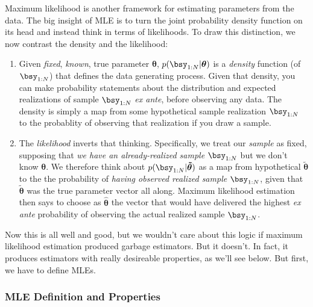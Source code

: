 \documentclass[12pt]{article}
\theoremstyle{plain}
\theoremstyle{definition}
\theoremstyle{remark}
\newcommand{\bstheta}{\boldsymbol{\theta}}
\newcommand{\bshattheta}{\boldsymbol{\hat{\theta}}}
\newcommand{\bstildetheta}{\boldsymbol{\tilde{\theta}}}
\begin{document}
Maximum likelihood is another framework for estimating parameters from
the data. The big insight of MLE is to turn the joint probability
density function on its head and instead think in terms of likelihoods.
To draw this distinction, we now contrast the density and the
likelihood:
\begin{enumerate}[label=(\roman*)]
  \item Given \emph{fixed}, \emph{known}, true parameter $\bstheta$,
    $p(\bsy_{1:N}|\bstheta)$ is a \emph{density} function (of
    $\bsy_{1:N}$) that defines the data generating process.  Given that
    density, you can make probability statements about the distribution
    and expected realizations of sample $\bsy_{1:N}$ \emph{ex ante},
    before observing any data. The density is simply a map from some
    hypothetical sample realization $\bsy_{1:N}$ to the probablity of
    observing that realization if you draw a sample.

  \item The \emph{likelihood} inverts that thinking. Specifically, we
    treat our \emph{sample} as fixed, supposing that
    \emph{we have an already-realized sample} $\bsy_{1:N}$ but we don't
    know $\bstheta$.  We therefore think about
    $p(\bsy_{1:N}|\bstildetheta)$ as a map from hypothetical
    $\bstildetheta$ to the the probability of
    \emph{having observed realized sample $\bsy_{1:N}$},
    given that $\bstildetheta$ was the true parameter vector all along.
    Maximum likelihood estimation then says to choose as $\bshattheta$
    the vector that would have delivered the highest \emph{ex ante}
    probability of observing the actual realized sample $\bsy_{1:N}$.
\end{enumerate}
Now this is all well and good, but we wouldn't care about this logic if
maximum likelihood estimation produced garbage estimators. But it
doesn't. In fact, it produces estimators with really desireable
properties, as we'll see below. But first, we have to define MLEs.

\subsubsection{MLE Definition and Properties}
\end{document}
